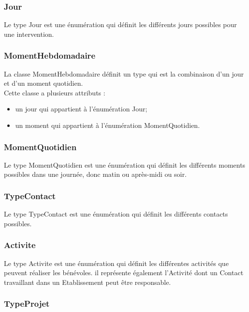 \subsubsection*{Jour}

Le type Jour est une énumération qui définit les différents jours possibles pour une intervention.

\subsubsection*{MomentHebdomadaire}

La classe MomentHebdomadaire définit un type qui est la combinaison d'un jour et d'un moment quotidien.\\
Cette classe a plusieurs attributs :
\begin{itemize}
\item un jour qui appartient à l'énumération Jour;
\item un moment qui appartient à l'énumération MomentQuotidien.
\end{itemize}

\subsubsection*{MomentQuotidien}

Le type MomentQuotidien est une énumération qui définit les différents moments possibles dans une journée, donc matin ou après-midi ou soir.

\subsubsection*{TypeContact}

Le type TypeContact est une énumération qui définit les différents contacts possibles.

\subsubsection*{Activite}

Le type Activite est une énumération qui définit les différentes activités que peuvent réaliser les bénévoles. il représente également l'Activité dont un Contact travaillant dans un Etablissement peut être responsable.

\subsubsection*{TypeProjet}

